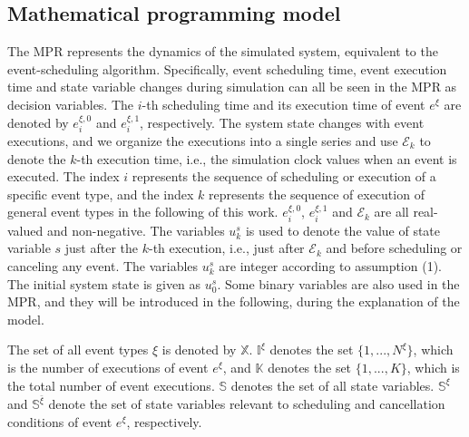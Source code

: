 \documentclass[]{interact}
\theoremstyle{plain}%
\theoremstyle{definition}
\theoremstyle{remark}
\begin{document}
\subsection{Mathematical programming model}


The MPR represents the dynamics of the simulated system,  equivalent to the event-scheduling algorithm. Specifically, event scheduling time, event execution time and state variable changes during simulation can all be seen in the MPR as decision variables. The $i$-th scheduling time and its execution time of event $e^{\xi}$ are denoted by $e^{\xi,0}_{i}$ and $e^{\xi,1}_{i}$, respectively. The system state changes with event executions, and we organize the executions into a single series and use $\mathcal{E}_k$ to denote the $k$-th execution time, i.e., the simulation clock values when an event is executed. The index $i$ represents the sequence of scheduling or execution of a specific event type, and the index $k$ represents the sequence of execution of general event types in the following of this work. $e^{\xi,0}_{i}$, $e^{\xi,1}_{i}$ and $\mathcal{E}_k$ are all real-valued and non-negative. The variables $u^s_k$ is used to denote the value of state variable $s$ just after the $k$-th execution, i.e., just after $\mathcal{E}_k$ and before scheduling or canceling any event. The variables $u^s_k$ are integer according to assumption (1). The initial system state is given as $u^s_0$. Some binary variables are also used in the MPR, and they will be introduced in the following, during the explanation of the model. 

The set of all event types $\xi$ is denoted by $\mathbb{X}$. $\mathbb{I}^{\xi}$ denotes the set $\{1,...,N^{\xi}\}$, which is the number of executions of event $e^{\xi}$, and $\mathbb{K}$ denotes the set $\{1,...,K\}$, which is the total number of event executions. $\mathbb{S}$ denotes the set of all state variables. $\mathbb{S}^{\xi}$ and $\mathbb{S}^{\bar{\xi}}$ denote the set of state variables relevant to scheduling and cancellation conditions of event $e^{\xi}$, respectively.
\end{document}
